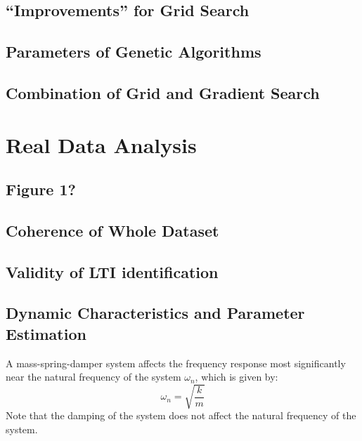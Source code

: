 \documentclass[11pt,a4paper]{article}
\begin{document}
\subsection{``Improvements'' for Grid Search}

\subsection{Parameters of Genetic  Algorithms}

\subsection{Combination of Grid and Gradient Search}

\section{Real Data Analysis}

\subsection{Figure 1?}

\subsection{Coherence of Whole Dataset}

\subsection{Validity of LTI identification}

\subsection{Dynamic Characteristics and Parameter Estimation}
A mass-spring-damper system affects the frequency response most significantly
near the natural frequency of the system $\omega_n$, which is given by:
\begin{equation}
    \omega_n = \sqrt{\frac{k}{m}}
\end{equation}
Note that the damping of the system does not affect the natural frequency of
the system.
\end{document}
